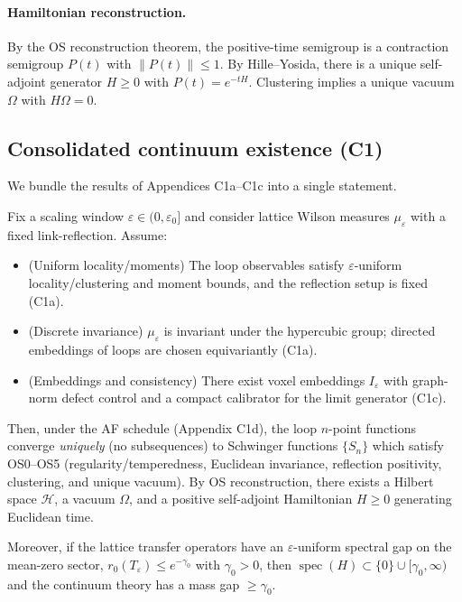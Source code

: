 \documentclass[11pt]{amsart}
\begin{document}
\paragraph{Hamiltonian reconstruction.}
By the OS reconstruction theorem, the positive-time semigroup is a contraction semigroup $P(t)$ with $\lVert P(t)\rVert\le 1$. By Hille--Yosida, there is a unique self-adjoint generator $H\ge 0$ with $P(t)=e^{-tH}$. Clustering implies a unique vacuum $\Omega$ with $H\Omega=0$.

\subsection*{Consolidated continuum existence (C1)}

We bundle the results of Appendices C1a--C1c into a single statement.

\begin{theorem}
Fix a scaling window $\varepsilon\in(0,\varepsilon_0]$ and consider lattice Wilson measures $\mu_\varepsilon$ with a fixed link-reflection. Assume:
\begin{itemize}
  \item (Uniform locality/moments) The loop observables satisfy $\varepsilon$-uniform locality/clustering and moment bounds, and the reflection setup is fixed (C1a).
  \item (Discrete invariance) $\mu_\varepsilon$ is invariant under the hypercubic group; directed embeddings of loops are chosen equivariantly (C1a).
  \item (Embeddings and consistency) There exist voxel embeddings $I_\varepsilon$ with graph-norm defect control and a compact calibrator for the limit generator (C1c).
\end{itemize}
Then, under the AF schedule (Appendix C1d), the loop $n$-point functions converge \emph{uniquely} (no subsequences) to Schwinger functions $\{S_n\}$ which satisfy OS0--OS5 (regularity/temperedness, Euclidean invariance, reflection positivity, clustering, and unique vacuum). By OS reconstruction, there exists a Hilbert space $\mathcal H$, a vacuum $\Omega$, and a positive self-adjoint Hamiltonian $H\ge 0$ generating Euclidean time.

Moreover, if the lattice transfer operators have an $\varepsilon$-uniform spectral gap on the mean-zero sector, $r_0(T_\varepsilon)\le e^{-\gamma_0}$ with $\gamma_0>0$, then $\operatorname{spec}(H)\subset\{0\}\cup[\gamma_0,\infty)$ and the continuum theory has a mass gap $\ge \gamma_0$.
\end{theorem}
\end{document}
